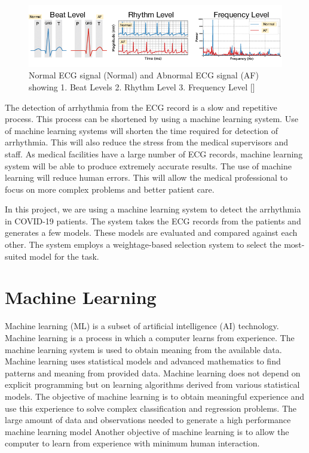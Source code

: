 \begin{figure}[ht]
  \centering
  \includegraphics[width=0.9\columnwidth]{media/introduction/NA_ECG_Signal.png}
  \caption{Normal ECG signal (Normal) and Abnormal ECG signal (AF) showing 1. Beat Levels 2. Rhythm Level 3. Frequency Level []}
  \label{fig:normal_abnormal_ecg_signal}
\end{figure}

The detection of arrhythmia from the ECG record is a slow and repetitive process. This process can be shortened by using a machine learning system. Use of machine learning systems will shorten the time required for detection of arrhythmia. This will also reduce the stress from the medical supervisors and staff. As medical facilities have a large number of ECG records, machine learning system will be able to produce extremely accurate results. The use of machine learning will reduce human errors. This will allow the medical professional to focus on more complex problems and better patient care.

In this project, we are using a machine learning system to detect the arrhythmia in COVID-19 patients. The system takes the ECG records from the patients and generates a few models. These models are evaluated and compared against each other. The system employs a weightage-based selection system to select the most-suited model for the task.

\section{Machine Learning}\label{sec:machine_learning_intro_chapter}

Machine learning (ML) is a subset of artificial intelligence (AI) technology. Machine learning is a process in which a computer learns from experience. The machine learning system is used to obtain meaning from the available data. Machine learning uses statistical models and advanced mathematics to find patterns and meaning from provided data. Machine learning does not depend on explicit programming but on learning algorithms derived from various statistical models. The objective of machine learning is to obtain meaningful experience and use this experience to solve complex classification and regression problems. The large amount of data and observations needed to generate a high performance machine learning model Another objective of machine learning is to allow the computer to learn from experience with minimum human interaction.

